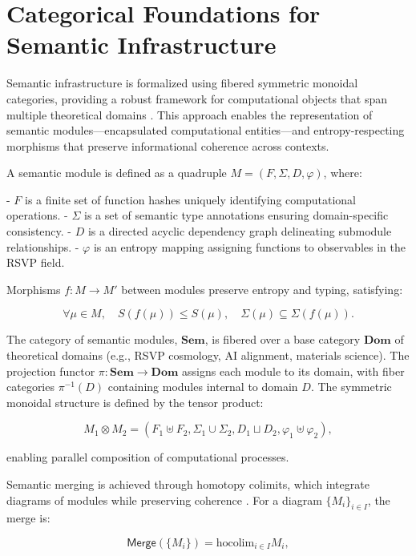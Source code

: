\documentclass[12pt]{article}
\begin{document}
\section{Categorical Foundations for Semantic Infrastructure}
\label{sec:categorical-foundations}

Semantic infrastructure is formalized using fibered symmetric monoidal categories, providing a robust framework for computational objects that span multiple theoretical domains \citep{BaezStay2010, MacLane1998}. This approach enables the representation of semantic modules—encapsulated computational entities—and entropy-respecting morphisms that preserve informational coherence across contexts.

A semantic module is defined as a quadruple \( M = (F, \Sigma, D, \varphi) \), where:

- \( F \) is a finite set of function hashes uniquely identifying computational operations.
- \( \Sigma \) is a set of semantic type annotations ensuring domain-specific consistency.
- \( D \) is a directed acyclic dependency graph delineating submodule relationships.
- \( \varphi \) is an entropy mapping assigning functions to observables in the RSVP field.

Morphisms \( f: M \to M' \) between modules preserve entropy and typing, satisfying:

\[ \forall \mu \in M, \quad S(f(\mu)) \leq S(\mu), \quad \Sigma(\mu) \subseteq \Sigma(f(\mu)). \]

The category of semantic modules, \( \mathbf{Sem} \), is fibered over a base category \( \mathbf{Dom} \) of theoretical domains (e.g., RSVP cosmology, AI alignment, materials science). The projection functor \( \pi: \mathbf{Sem} \to \mathbf{Dom} \) assigns each module to its domain, with fiber categories \( \pi^{-1}(D) \) containing modules internal to domain \( D \). The symmetric monoidal structure is defined by the tensor product:

\[ M_1 \otimes M_2 = (F_1 \uplus F_2, \Sigma_1 \cup \Sigma_2, D_1 \sqcup D_2, \varphi_1 \uplus \varphi_2), \]

enabling parallel composition of computational processes.

Semantic merging is achieved through homotopy colimits, which integrate diagrams of modules while preserving coherence \citep{Lurie2009, Riehl2016}. For a diagram \( \{M_i\}_{i \in I} \), the merge is:

\[ \mathsf{Merge}(\{M_i\}) = \mathrm{hocolim}_{i \in I} M_i, \]
\end{document}
